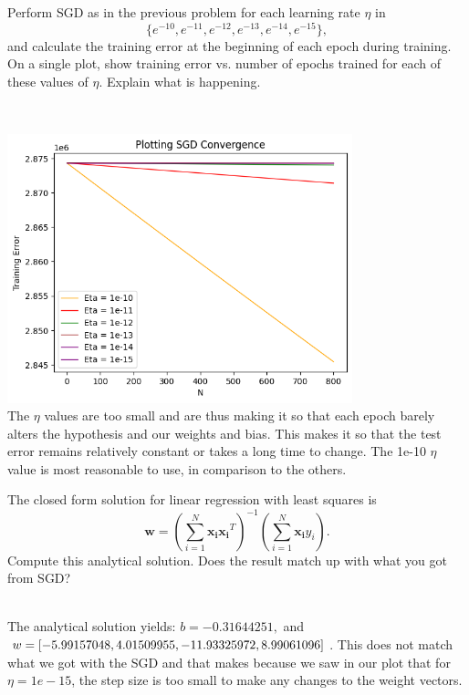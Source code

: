 \begin{problem}[2]
  Perform SGD as in the previous problem for each learning rate $\eta$ in \[\{e^{-10}, e^{-11}, e^{-12}, e^{-13}, e^{-14}, e^{-15}\},\] and calculate the training error at the beginning of each epoch during training.  On a single plot, show training error vs. number of epochs trained for each of these values of $\eta$. Explain what is happening.
\end{problem}
\begin{solution}
  \\
  \graphicspath{{images/}}
  \includegraphics[width=10cm]{Problem_3_H.png}
  \\
  The $\eta$ values are too small and are thus making it so that each epoch barely alters the hypothesis and our weights and bias. This makes it so that the test error remains relatively constant or takes a long time to change. The 1e-10 $\eta$ value is most reasonable to use, in comparison to the others. 
\end{solution}


\begin{problem}[2]
  The closed form solution for linear regression with least squares is \[\mathbf{w} = \left(\sum_{i=1}^N \mathbf{x_i}\mathbf{x_i}^T\right)^{-1}\left(\sum_{i=1}^N \mathbf{x_i}y_i\right).\]  Compute this analytical solution.  Does the result match up with what you got from SGD?
\end{problem}
\begin{solution}
  \\
 The analytical solution yields: $b = -0.31644251, $ and $w = [-5.99157048,  4.01509955, -11.93325972, \\ 8.99061096]$. This does not match what we got with the SGD and that makes because we saw in our plot that for $\eta = 1e-15$, the step size is too small to make any changes to the weight vectors.
\end{solution}

